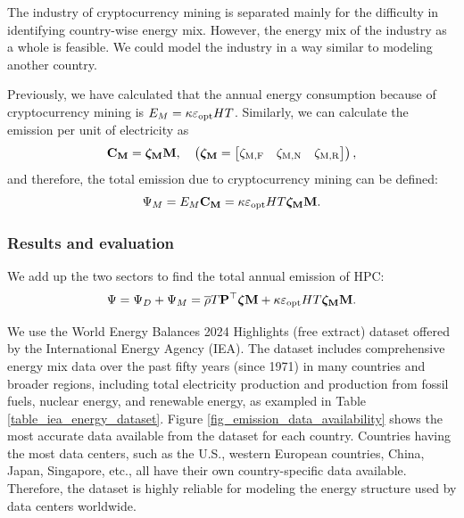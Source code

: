 \documentclass[12pt]{article}
\begin{document}
The industry of cryptocurrency mining is separated mainly for the difficulty in identifying country-wise energy mix. However, the energy mix of the industry as a whole is feasible. We could model the industry in a way similar to modeling another country.

Previously, we have calculated that the annual energy consumption because of cryptocurrency mining is $E_M = \kappa \varepsilon_{\rm opt} HT$. Similarly, we can calculate the  emission per unit of electricity as
\begin{equation}
	\vb{C_M} = \boldsymbol{\rm \zeta_M} \vb{M}, \quad
	\left(
		\boldsymbol{\rm \zeta_M} =
		\begin{bmatrix}
			\zeta_{\rm M, F} & \zeta_{\rm M, N} & \zeta_{\rm M, R} \\
		\end{bmatrix}
	\right),
\end{equation}
and therefore, the total  emission due to cryptocurrency mining can be defined:
\begin{equation}
	\Psi_M = E_M \vb{C_M} = \kappa \varepsilon_{\rm opt} HT \boldsymbol{\rm \zeta_M} \vb{M}.
\end{equation}

\subsubsection{Results and evaluation}

We add up the two sectors to find the total annual  emission of HPC:
\begin{equation}
	\Psi = \Psi_D + \Psi_M
	= \overline{\rho} T \vb{P}^\top \boldsymbol{\zeta} \vb{M}
		+ \kappa \varepsilon_{\rm opt} HT \boldsymbol{\rm \zeta_M} \vb{M}.
\end{equation}

We use the World Energy Balances 2024 Highlights (free extract) dataset \citep{energy_mix_dataset} offered by the International Energy Agency (IEA). The dataset includes comprehensive energy mix data over the past fifty years (since 1971) in many countries and broader regions, including total electricity production and production from fossil fuels, nuclear energy, and renewable energy, as exampled in Table \ref{table_iea_energy_dataset}. Figure \ref{fig_emission_data_availability} shows the most accurate data available from the dataset for each country. Countries having the most data centers, such as the U.S., western European countries, China, Japan, Singapore, etc., all have their own country-specific data available. Therefore, the dataset is highly reliable for modeling the energy structure used by data centers worldwide.
\end{document}
